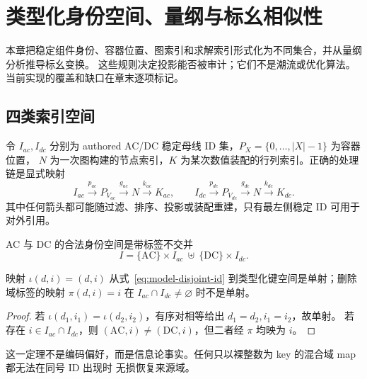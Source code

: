 \section{类型化身份空间、量纲与标幺相似性}

\begin{theorynote}
本章把稳定组件身份、容器位置、图索引和求解索引形式化为不同集合，并从量纲分析推导标幺变换。
这些规则决定投影能否被审计；它们不是潮流或优化算法。当前实现的覆盖和缺口在章末逐项标记。
\end{theorynote}

\subsection{四类索引空间}

令 $I_{ac},I_{dc}$ 分别为 authored AC/DC 稳定母线 ID 集，$P_X=\{0,\ldots,|X|-1\}$ 为容器位置，
$N$ 为一次图构建的节点索引，$K$ 为某次数值装配的行列索引。正确的处理链是显式映射
\begin{equation}
 I_{ac}\xrightarrow{p_{ac}}P_{V_{ac}}\xrightarrow{g_{ac}}N
 \xrightarrow{k_{ac}}K_{ac},
 \qquad
 I_{dc}\xrightarrow{p_{dc}}P_{V_{dc}}\xrightarrow{g_{dc}}N
 \xrightarrow{k_{dc}}K_{dc}.
 \label{eq:model-index-chain}
\end{equation}
其中任何箭头都可能随过滤、排序、投影或装配重建，只有最左侧稳定 ID 可用于对外引用。

AC 与 DC 的合法身份空间是带标签不交并
\begin{equation}
 I=\{\mathrm{AC}\}\times I_{ac}\ \uplus\
   \{\mathrm{DC}\}\times I_{dc}.
 \label{eq:model-disjoint-id}
\end{equation}

\begin{theorem}
映射 $\iota(d,i)=(d,i)$ 从式~\eqref{eq:model-disjoint-id} 到类型化键空间是单射；删除域标签的映射
$\pi(d,i)=i$ 在 $I_{ac}\cap I_{dc}\ne\varnothing$ 时不是单射。
\end{theorem}
\begin{proof}
若 $\iota(d_1,i_1)=\iota(d_2,i_2)$，有序对相等给出 $d_1=d_2,i_1=i_2$，故单射。
若存在 $i\in I_{ac}\cap I_{dc}$，则 $(\mathrm{AC},i)\ne(\mathrm{DC},i)$，但二者经 $\pi$ 均映为 $i$。
\end{proof}

这一定理不是编码偏好，而是信息论事实。任何只以裸整数为 key 的混合域 map 都无法在同号 ID 出现时
无损恢复来源域。


